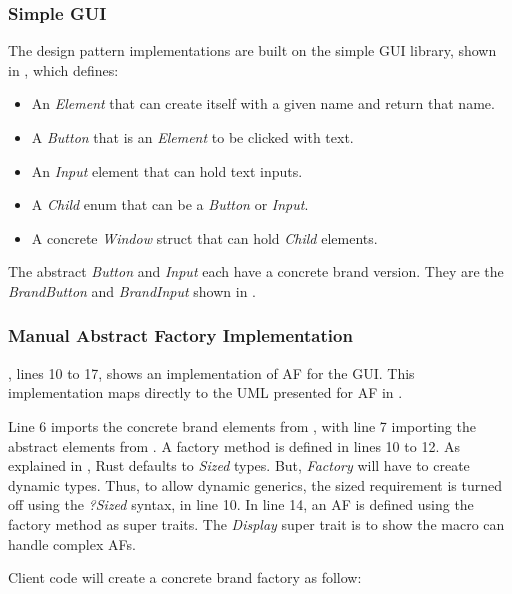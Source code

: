 \subsubsection{Simple GUI}
The design pattern implementations are built on the simple GUI library, shown in , which defines:

\begin{itemize}
	\item An \textit{Element} that can create itself with a given name and return that name.
	\item A \textit{Button} that is an \textit{Element} to be clicked with text.
	\item An \textit{Input} element that can hold text inputs.
	\item A \textit{Child} enum that can be a \textit{Button} or \textit{Input}.
	\item A concrete \textit{Window} struct that can hold \textit{Child} elements.
\end{itemize}

The abstract \textit{Button} and \textit{Input} each have a concrete brand version.
They are the \textit{BrandButton} and \textit{BrandInput} shown in .

\subsubsection{Manual Abstract Factory Implementation}
, lines 10 to 17, shows an implementation of AF for the GUI.
This implementation maps directly to the UML presented for AF in .

Line 6 imports the concrete brand elements from , with line 7 importing the abstract elements from .
A factory method is defined in lines 10 to 12.
As explained in , Rust defaults to \textit{Sized} types.
But, \textit{Factory} will have to create dynamic types.
Thus, to allow dynamic generics, the sized requirement is turned off using the \textit{?Sized} syntax, in line 10.
In line 14, an AF is defined using the factory method as super traits.
The \textit{Display} super trait is to show the macro can handle complex AFs.

Client code will create a concrete brand factory as follow:


